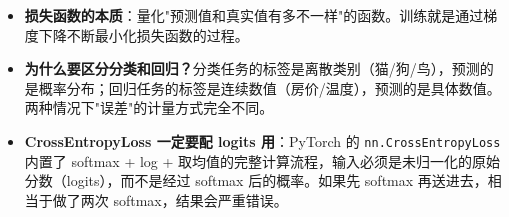 \documentclass[a4paper,11pt]{ctexart}
\begin{document}
\begin{beginnerbox}
    \begin{itemize}
        \item \textbf{损失函数的本质}：量化"预测值和真实值有多不一样"的函数。训练就是通过梯度下降不断最小化损失函数的过程。
        \item \textbf{为什么要区分分类和回归？}分类任务的标签是离散类别（猫/狗/鸟），预测的是概率分布；回归任务的标签是连续数值（房价/温度），预测的是具体数值。两种情况下"误差"的计量方式完全不同。
        \item \textbf{CrossEntropyLoss 一定要配 logits 用}：PyTorch 的 \texttt{nn.CrossEntropyLoss} 内置了 softmax + log + 取均值的完整计算流程，输入必须是未归一化的原始分数（logits），而不是经过 softmax 后的概率。如果先 softmax 再送进去，相当于做了两次 softmax，结果会严重错误。
    \end{itemize}
\end{beginnerbox}
\end{document}
